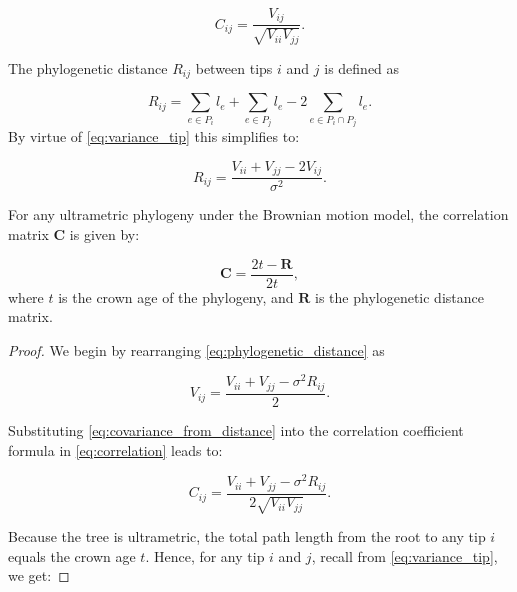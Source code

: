 {\begin{definition}
\begin{equation}
    C_{ij} = \frac{V_{ij}}{\sqrt{V_{ii} V_{jj}}}.
    \label{eq:correlation}
\end{equation}
\end{definition}

\begin{definition}
The phylogenetic distance \( R_{ij} \) between tips \( i \) and \( j \) is defined as

\begin{equation}
    R_{ij} = \sum_{e \in P_i} l_e + \sum_{e \in P_j} l_e - 2 \sum_{e \in P_i \cap P_j} l_e.
\end{equation}
By virtue of \autoref{eq:variance_tip} this simplifies to:

\begin{equation}
    R_{ij} = \frac{V_{ii} + V_{jj} - 2 V_{ij}}{\sigma^2}.
    \label{eq:phylogenetic_distance}
\end{equation}
\end{definition}

\begin{theorem}
For any ultrametric phylogeny under the Brownian motion model, the correlation matrix \( \boldsymbol{C} \) is given by:

\begin{equation}
    \boldsymbol{C} = \frac{2t - \boldsymbol{R}}{2t},
\end{equation}
where \( t \) is the crown age of the phylogeny, and \( \boldsymbol{R} \) is the phylogenetic distance matrix.
\label{theorem:one}
\end{theorem}

\begin{proof}
We begin by rearranging \autoref{eq:phylogenetic_distance} as

\begin{equation}
    V_{ij} = \frac{V_{ii} + V_{jj} - \sigma^2 R_{ij}}{2}.
    \label{eq:covariance_from_distance}
\end{equation}

\noindent Substituting \autoref{eq:covariance_from_distance} into the correlation coefficient formula in \autoref{eq:correlation} leads to:

\begin{equation}
    C_{ij} = \frac{V_{ii} + V_{jj} - \sigma^2 R_{ij}}{2\sqrt{V_{ii} V_{jj}}}.
    \label{eq:correlation_substitute}
\end{equation}

\noindent Because the tree is ultrametric, the total path length from the root to any tip \( i \) equals the crown age \( t \). Hence, for any tip \( i \) and \( j \), recall from \autoref{eq:variance_tip}, we get:


\end{proof}}
